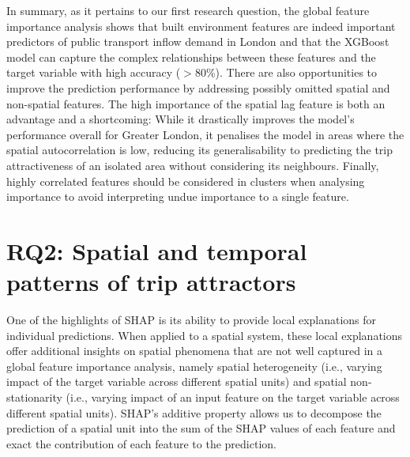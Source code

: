 In summary, as it pertains to our first research question, the global feature importance analysis shows that built environment features are indeed important predictors of public transport inflow demand in London and that the XGBoost model can capture the complex relationships between these features and the target variable with high accuracy ($>80\%$). There are also opportunities to improve the prediction performance by addressing possibly omitted spatial and non-spatial features. The high importance of the spatial lag feature is both an advantage and a shortcoming: While it drastically improves the model's performance overall for Greater London, it penalises the model in areas where the spatial autocorrelation is low, reducing its generalisability to predicting the trip attractiveness of an isolated area without considering its neighbours. Finally, highly correlated features should be considered in clusters when analysing importance to avoid interpreting undue importance to a single feature.

\pagebreak[4]
\section{RQ2: Spatial and temporal patterns of trip attractors}

One of the highlights of SHAP is its ability to provide local explanations for individual predictions. When applied to a spatial system, these local explanations offer additional insights on spatial phenomena that are not well captured in a global feature importance analysis, namely spatial heterogeneity (i.e., varying impact of the target variable across different spatial units) and spatial non-stationarity (i.e., varying impact of an input feature on the target variable across different spatial units). SHAP's additive property allows us to decompose the prediction of a spatial unit into the sum of the SHAP values of each feature and exact the contribution of each feature to the prediction.

